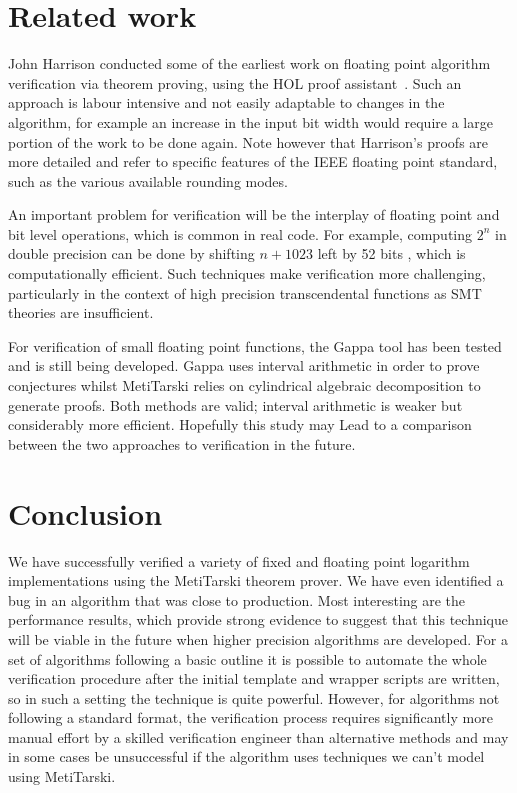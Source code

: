 \documentclass[a4]{article}
\begin{document}
\section{Related work}
John Harrison conducted some of the earliest work on floating point algorithm verification via theorem proving, using the HOL proof assistant~\cite{harrison1997floating}. Such an approach is labour intensive and not easily adaptable to changes in the algorithm, for example an increase in the input bit width would require a large portion of the work to be done again. Note however that Harrison's proofs are more detailed and refer to specific features of the IEEE floating point standard, such as the various available rounding modes. 

An important problem for verification will be the interplay of floating point and bit level operations, which is common in real code. For example, computing $2^n$ in double precision can be done by shifting $n+1023$ left by 52 bits \cite{mine2012abstract}, which is computationally efficient. Such techniques make verification more challenging, particularly in the context of high precision transcendental functions \cite{lee2016verifying} as SMT theories are insufficient. 

For verification of small floating point functions, the Gappa tool \cite{de2006assisted,boldo2009combining} has been tested and is still being developed. Gappa uses interval arithmetic in order to prove conjectures whilst MetiTarski relies on cylindrical algebraic decomposition to generate proofs. Both methods are valid; interval arithmetic is weaker but considerably more efficient. Hopefully this study may Lead to a comparison between the two approaches to verification in the future.

\section{Conclusion}
We have successfully verified a variety of fixed and floating point logarithm implementations using the MetiTarski theorem prover.
We have even identified a bug in an algorithm that was close to production. Most interesting are the performance results, which provide strong evidence to suggest that this technique will be viable in the future when higher precision algorithms are developed. For a set of algorithms following a basic outline it is possible to automate the whole verification procedure after the initial template and wrapper scripts are written, so in such a setting the technique is quite powerful. However, for algorithms not following a standard format, the verification process requires significantly more manual effort by a skilled verification engineer than alternative methods and may in some cases be unsuccessful if the algorithm uses techniques we can't model using MetiTarski. 
\end{document}
